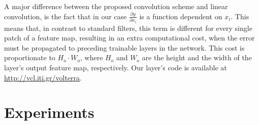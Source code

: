 \documentclass[10pt,twocolumn,letterpaper]{article}
\begin{document}
     A major difference between the proposed convolution scheme and linear convolution, is the fact that in our case $\frac{\partial y}{\partial {x_i}}$ is a function dependent on $x_i$. This means that, in contrast to standard filters, this term is different for every single patch of a feature map, resulting in an extra computational cost, when the error must be propagated to preceding trainable layers in the network. This cost is proportionate to $H_o \cdot W_o$, where $H_o$ and $W_o$ are the height and the width of the layer's output feature map, respectively. Our layer's code is available at \url{http://vcl.iti.gr/volterra}.
     
\section{Experiments}
\label{Experiments}
\end{document}

